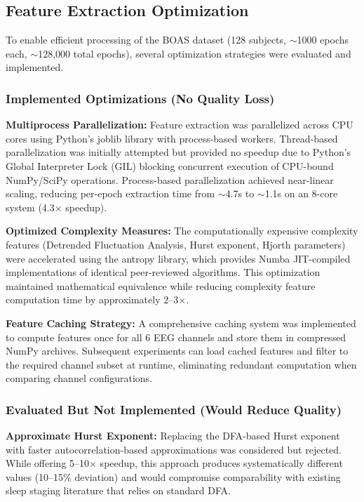 \documentclass{imc-inf} %
\begin{document}
\subsection{Feature Extraction Optimization}

To enable efficient processing of the BOAS dataset (128 subjects, $\sim$1000 epochs each, $\sim$128,000 total epochs), several optimization strategies were evaluated and implemented.

\subsubsection{Implemented Optimizations (No Quality Loss)}

\textbf{Multiprocess Parallelization:} Feature extraction was parallelized across CPU cores using Python's joblib library with process-based workers. Thread-based parallelization was initially attempted but provided no speedup due to Python's Global Interpreter Lock (GIL) blocking concurrent execution of CPU-bound NumPy/SciPy operations. Process-based parallelization achieved near-linear scaling, reducing per-epoch extraction time from $\sim$4.7s to $\sim$1.1s on an 8-core system (4.3$\times$ speedup).

\textbf{Optimized Complexity Measures:} The computationally expensive complexity features (Detrended Fluctuation Analysis, Hurst exponent, Hjorth parameters) were accelerated using the antropy library, which provides Numba JIT-compiled implementations of identical peer-reviewed algorithms. This optimization maintained mathematical equivalence while reducing complexity feature computation time by approximately 2--3$\times$.

\textbf{Feature Caching Strategy:} A comprehensive caching system was implemented to compute features once for all 6 EEG channels and store them in compressed NumPy archives. Subsequent experiments can load cached features and filter to the required channel subset at runtime, eliminating redundant computation when comparing channel configurations.

\subsubsection{Evaluated But Not Implemented (Would Reduce Quality)}

\textbf{Approximate Hurst Exponent:} Replacing the DFA-based Hurst exponent with faster auto\-correlation-based approximations was considered but rejected. While offering 5--10$\times$ speedup, this approach produces systematically different values (10--15\% deviation) and would compromise comparability with existing sleep staging literature that relies on standard DFA.
\end{document}
